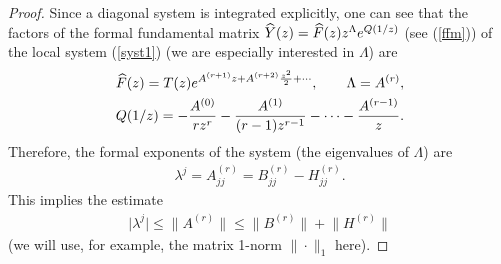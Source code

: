 \documentclass[11pt]{article}
\numberwithin{equation}{section}
\begin{document}
\begin{proof}
Since a diagonal system is integrated explicitly, one can see that the factors of the formal fundamental matrix
$\widehat Y(z)=\widehat F(z) z^{\Lambda}{\rm e}^{Q(1/z)}$ (see (\ref{ffm})) of the local system (\ref{syst1}) (we are
especially interested in $\Lambda$) are
\begin{gather*}
\widehat F(z)=T(z){\rm e}^{A^{(r+1)}z+A^{(r+2)}\frac{z^2}2+\cdots}, \qquad \Lambda=A^{(r)},\\
Q(1/z)=-\frac{A^{(0)}}{rz^r}-\frac{A^{(1)}}{(r-1)z^{r-1}}-\cdots-\frac{A^{(r-1)}}z.
\end{gather*}
Therefore, the formal exponents of the system (the eigenvalues of $\Lambda$) are
\begin{gather*}
\lambda^j=A^{(r)}_{jj}=B^{(r)}_{jj}-H^{(r)}_{jj}.
\end{gather*}
This implies the estimate
\begin{gather*}
\big|\lambda^j\big|\leqslant\big\|A^{(r)}\big\|\leqslant\big\|B^{(r)}\big\|+\big\|H^{(r)}\big\|
\end{gather*}
(we will use, for example, the matrix 1-norm $\|\cdot\|_1$ here).


\end{proof}
\end{document}
